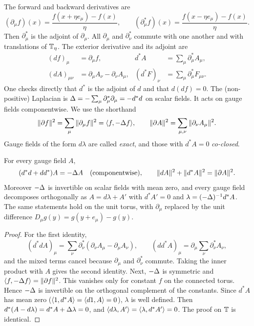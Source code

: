 The forward and backward derivatives are
\[
(\partial_\mu f)(x)=\frac{f(x+\eta e_\mu)-f(x)}{\eta},\qquad (\partial_\mu^*f)(x)=\frac{f(x-\eta e_\mu)-f(x)}{\eta}.
\]
Then $\partial_\mu^*$ is the adjoint of $\partial_\mu$. All $\partial_\mu$ and $\partial_\nu^*$ commute with one another and with translations of $\mathbb T_\eta$. The exterior derivative and its adjoint are
\begin{align*}
(df)_\mu&=\partial_\mu f, & d^*A&=\sum_\mu\partial_\mu^*A_\mu,\\
(dA)_{\mu\nu}&=\partial_\mu A_\nu-\partial_\nu A_\mu, & (d^*F)_\nu&=\sum_\mu\partial_\mu^*F_{\mu\nu}.
\end{align*}
One checks directly that $d^*$ is the adjoint of $d$ and that $d(df)=0$. The (non-positive) Laplacian is $\Delta=-\sum_\mu\partial_\mu^*\partial_\mu=-d^*d$ on scalar fields. It acts on gauge fields componentwise. We use the shorthand
\[
\|\partial f\|^2=\sum_\mu\|\partial_\mu f\|^2=\langle f,-\Delta f\rangle,\qquad
\|\partial A\|^2=\sum_{\mu,\nu}\|\partial_\nu A_\mu\|^2 .
\]
Gauge fields of the form $d\lambda$ are called \emph{exact}, and those with $d^*A=0$ \emph{co-closed}.

\begin{lemma}\label{lem:hodge}
For every gauge field $A$,
\[
(d^*d+dd^*)A=-\Delta A\quad\text{(componentwise)},\qquad
\|dA\|^2+\|d^*A\|^2=\|\partial A\|^2 .
\]
Moreover $-\Delta$ is invertible on scalar fields with mean zero, and every gauge field decomposes orthogonally as $A=d\lambda+A'$ with $d^*A'=0$ and $\lambda=(-\Delta)^{-1}d^*A$. The same statements hold on the unit torus, with $\partial_\mu$ replaced by the unit difference $D_\mu g(y)=g(y+e_\mu)-g(y)$.
\end{lemma}

\begin{proof}
For the first identity,
\[
(d^*dA)_\mu=\sum_\nu\partial^*_\nu(\partial_\nu A_\mu-\partial_\mu A_\nu),\qquad (dd^*A)_\mu=\partial_\mu\sum_\nu\partial^*_\nu A_\nu,
\]
and the mixed terms cancel because $\partial_\mu$ and $\partial^*_\nu$ commute. Taking the inner product with $A$ gives the second identity. Next, $-\Delta$ is symmetric and $\langle f,-\Delta f\rangle=\|\partial f\|^2$. This vanishes only for constant $f$ on the connected torus. Hence $-\Delta$ is invertible on the orthogonal complement of the constants. Since $d^*A$ has mean zero ($\langle 1,d^*A\rangle=\langle d1,A\rangle=0$), $\lambda$ is well defined. Then $d^*(A-d\lambda)=d^*A+\Delta\lambda=0$, and $\langle d\lambda,A'\rangle=\langle \lambda,d^*A'\rangle=0$. The proof on $\mathbb T$ is identical.
\end{proof}

